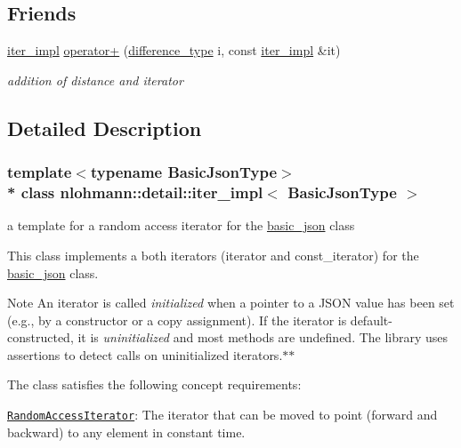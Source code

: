 \subsection*{Friends}
\begin{DoxyCompactItemize}
\item 
\hyperlink{classnlohmann_1_1detail_1_1iter__impl}{iter\+\_\+impl} \hyperlink{classnlohmann_1_1detail_1_1iter__impl_a94108d1a7563e103534f23eb5c1ee175}{operator+} (\hyperlink{classnlohmann_1_1detail_1_1iter__impl_a2f7ea9f7022850809c60fc3263775840}{difference\+\_\+type} i, const \hyperlink{classnlohmann_1_1detail_1_1iter__impl}{iter\+\_\+impl} \&it)
\begin{DoxyCompactList}\small\item\em addition of distance and iterator \end{DoxyCompactList}\end{DoxyCompactItemize}


\subsection{Detailed Description}
\subsubsection*{template$<$typename Basic\+Json\+Type$>$\\*
class nlohmann\+::detail\+::iter\+\_\+impl$<$ Basic\+Json\+Type $>$}

a template for a random access iterator for the \hyperlink{classnlohmann_1_1basic__json}{basic\+\_\+json} class 

This class implements a both iterators (iterator and const\+\_\+iterator) for the \hyperlink{classnlohmann_1_1basic__json}{basic\+\_\+json} class.

\begin{DoxyNote}{Note}
An iterator is called {\itshape initialized} when a pointer to a J\+S\+ON value has been set (e.\+g., by a constructor or a copy assignment). If the iterator is default-\/constructed, it is {\itshape uninitialized} and most methods are undefined. The library uses assertions to detect calls on uninitialized iterators.$\ast$$\ast$
\end{DoxyNote}
The class satisfies the following concept requirements\+:
\begin{DoxyItemize}
\item \href{http://en.cppreference.com/w/cpp/concept/RandomAccessIterator}{\tt Random\+Access\+Iterator}\+: The iterator that can be moved to point (forward and backward) to any element in constant time.
\end{DoxyItemize}

